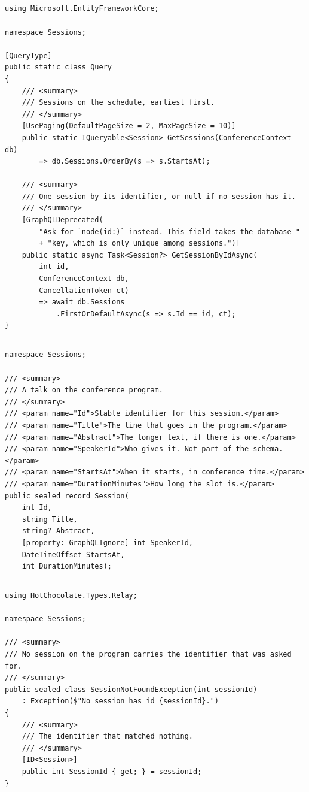 \subsection*{}
\begin{verbatim}
using Microsoft.EntityFrameworkCore;

namespace Sessions;

[QueryType]
public static class Query
{
    /// <summary>
    /// Sessions on the schedule, earliest first.
    /// </summary>
    [UsePaging(DefaultPageSize = 2, MaxPageSize = 10)]
    public static IQueryable<Session> GetSessions(ConferenceContext db)
        => db.Sessions.OrderBy(s => s.StartsAt);

    /// <summary>
    /// One session by its identifier, or null if no session has it.
    /// </summary>
    [GraphQLDeprecated(
        "Ask for `node(id:)` instead. This field takes the database "
        + "key, which is only unique among sessions.")]
    public static async Task<Session?> GetSessionByIdAsync(
        int id,
        ConferenceContext db,
        CancellationToken ct)
        => await db.Sessions
            .FirstOrDefaultAsync(s => s.Id == id, ct);
}
\end{verbatim}

\subsection*{}
\begin{verbatim}
namespace Sessions;

/// <summary>
/// A talk on the conference program.
/// </summary>
/// <param name="Id">Stable identifier for this session.</param>
/// <param name="Title">The line that goes in the program.</param>
/// <param name="Abstract">The longer text, if there is one.</param>
/// <param name="SpeakerId">Who gives it. Not part of the schema.</param>
/// <param name="StartsAt">When it starts, in conference time.</param>
/// <param name="DurationMinutes">How long the slot is.</param>
public sealed record Session(
    int Id,
    string Title,
    string? Abstract,
    [property: GraphQLIgnore] int SpeakerId,
    DateTimeOffset StartsAt,
    int DurationMinutes);
\end{verbatim}

\subsection*{}
\begin{verbatim}
using HotChocolate.Types.Relay;

namespace Sessions;

/// <summary>
/// No session on the program carries the identifier that was asked for.
/// </summary>
public sealed class SessionNotFoundException(int sessionId)
    : Exception($"No session has id {sessionId}.")
{
    /// <summary>
    /// The identifier that matched nothing.
    /// </summary>
    [ID<Session>]
    public int SessionId { get; } = sessionId;
}
\end{verbatim}

